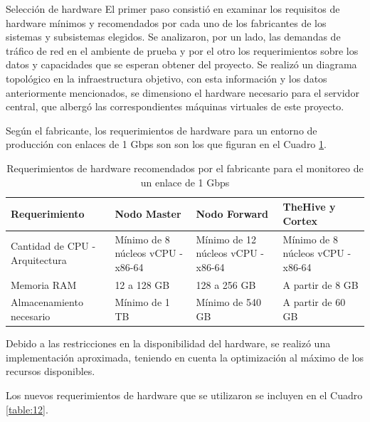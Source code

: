     
    \begin{section}{Selección de hardware} 
        El primer paso consistió en examinar los requisitos de hardware mínimos y recomendados por cada uno de los fabricantes de los sistemas y subsistemas elegidos. Se analizaron, por un lado, las demandas de tráfico de red en el ambiente de prueba y por el otro los requerimientos sobre los datos y capacidades que se esperan obtener del proyecto. Se realizó un diagrama topológico en la infraestructura objetivo, con esta información y los datos anteriormente mencionados, se dimensiono el hardware necesario para el servidor central, que albergó las correspondientes máquinas virtuales de este proyecto.\par
        Según el fabricante, los requerimientos de hardware para un entorno de producción con enlaces de 1 Gbps son son los que figuran en el Cuadro \ref{table:5}.
        
        \begin{table}[H]
        \centering
        \begin{tabular}{|m{9em}|m{9em}|m{9em}|m{9em}|}
        
            \hline 
                Requerimiento  & Nodo Master &  Nodo Forward & TheHive y Cortex \\ 
            \hline
                Cantidad de CPU - Arquitectura & Mínimo de 8 núcleos vCPU - x86-64 & Mínimo de 12 núcleos vCPU - x86-64 & Mínimo de 8 núcleos vCPU - x86-64 \\ 
            \hline
                Memoria RAM  & 12 a 128 GB & 128 a 256 GB & A partir de 8 GB \\ 
            \hline
                Almacenamiento necesario & Mínimo de 1 TB  & Mínimo de 540 GB & A partir de 60 GB \\
            \hline %
        \end{tabular}
        \caption{Requerimientos de hardware recomendados por el fabricante para el monitoreo de un enlace de 1 Gbps}
        \label{table:5}
        \end{table}
        
        Debido a las restricciones en la disponibilidad del hardware, se realizó una implementación aproximada, teniendo en cuenta la optimización al máximo de los recursos disponibles. \par
	    Los nuevos requerimientos de hardware que se utilizaron se incluyen en el Cuadro \ref{table:12}.

        \begin{table}[H]
        \centering
        \begin{tabular}{|m{9em}|m{9em}|m{9em}|m{9em}|}
        

\end{tabular}
\end{table}
\end{section}

